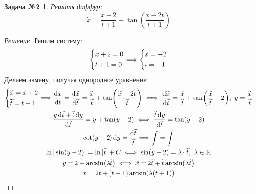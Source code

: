 \documentclass[a4paper,12pt]{article}
\newtheorem*{task2}{Задача №2}
\newcommand{\R}{\mathbb{R}}
\renewcommand*\d{\mathop{}\!\mathrm{d}}
\newcommand{\dx}{\dot{x}}
\newcommand{\wx}{\widetilde{x}}
\newcommand{\wt}{\widetilde{t}}
\newcommand{\ds}{\displaystyle}
\begin{document}
\begin{task2}
	Решить диффур:
	\[\dx = \dfrac{x + 2}{t + 1} + \tan(\dfrac{x - 2t}{t + 1})\]	 
\end{task2}
\begin{proof}[Решение]
	Решим систему:
	\[\left\{\begin{gathered}
	x + 2 = 0\hfill\\
	t + 1 = 0\hfill
	\end{gathered}\right. \Longrightarrow \left\{\begin{gathered}
	x = -2\hfill\\
	t = -1\hfill
	\end{gathered}\right.\]
	Делаем замену, получая однородное уравнение:
	\begin{gather*}\left\{\begin{gathered}
	\wx = x + 2\hfill\\
	\wt = t + 1\hfill
	\end{gathered}\right. \Longrightarrow \dfrac{\d x}{\d t} = \dfrac{\d \wx}{\d\wt} = \dfrac{\wx}{\wt} + \tan(\dfrac{\wx - 2\wt}{\wt}) \iff \dfrac{\d \wx}{\d\wt} = \dfrac{\wx}{\wt} + \tan(\dfrac{\wx}{\wt} - 2),\ y = \dfrac{\wx}{\wt}\\
	\dfrac{y\d \wt + \wt\d y}{\d \wt} = y + \tan(y - 2) \iff \dfrac{\wt\d y}{\d\wt} = \tan(y - 2) \\
	\cot(y - 2)\d y = \dfrac{\d \wt}{\wt} \Longrightarrow \ds\int = \int\\
	\ln|\sin(y - 2)| = \ln|\wt| + C \iff \sin(y - 2) = \lambda\cdot \wt,\ \lambda \in \R\\
	y = 2 + \arcsin(\lambda \wt) \iff \wx = 2\wt + \wt\arcsin(\lambda\wt)\\
	x = 2t + (t + 1)\arcsin(\lambda(t + 1))
	\end{gather*}
\end{proof}
\end{document}
